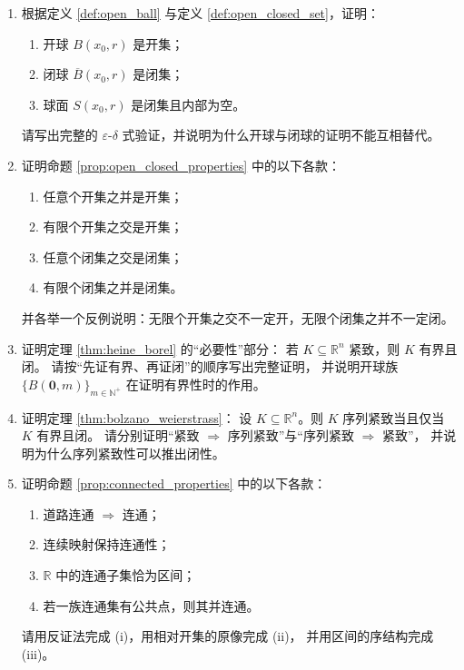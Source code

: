 \begin{enumerate}[leftmargin=3em, label=\textbf{题 \arabic*}]

    \item 根据定义 \ref{def:open_ball} 与定义 \ref{def:open_closed_set}，证明：
    \begin{enumerate}[label=(\roman*)]
        \item 开球 $B(x_0,r)$ 是开集；
        \item 闭球 $\overline{B}(x_0,r)$ 是闭集；
        \item 球面 $S(x_0,r)$ 是闭集且内部为空。
    \end{enumerate}
    请写出完整的 $\varepsilon$-$\delta$ 式验证，并说明为什么开球与闭球的证明不能互相替代。

    \item 证明命题 \ref{prop:open_closed_properties} 中的以下各款：
    \begin{enumerate}[label=(\roman*)]
        \item 任意个开集之并是开集；
        \item 有限个开集之交是开集；
        \item 任意个闭集之交是闭集；
        \item 有限个闭集之并是闭集。
    \end{enumerate}
    并各举一个反例说明：无限个开集之交不一定开，无限个闭集之并不一定闭。

    \item 证明定理 \ref{thm:heine_borel} 的“必要性”部分：
    若 $K \subseteq \mathbb{R}^n$ 紧致，则 $K$ 有界且闭。
    请按“先证有界、再证闭”的顺序写出完整证明，
    并说明开球族 $\{B(\mathbf{0},m)\}_{m\in\mathbb{N}^+}$ 在证明有界性时的作用。

    \item 证明定理 \ref{thm:bolzano_weierstrass}：
    设 $K \subseteq \mathbb{R}^n$。则 $K$ 序列紧致当且仅当 $K$ 有界且闭。
    请分别证明“紧致 $\Rightarrow$ 序列紧致”与“序列紧致 $\Rightarrow$ 紧致”，
    并说明为什么序列紧致性可以推出闭性。

    \item 证明命题 \ref{prop:connected_properties} 中的以下各款：
    \begin{enumerate}[label=(\roman*)]
        \item 道路连通 $\Rightarrow$ 连通；
        \item 连续映射保持连通性；
        \item $\mathbb{R}$ 中的连通子集恰为区间；
        \item 若一族连通集有公共点，则其并连通。
    \end{enumerate}
    请用反证法完成 (i)，用相对开集的原像完成 (ii)，
    并用区间的序结构完成 (iii)。


\end{enumerate}
